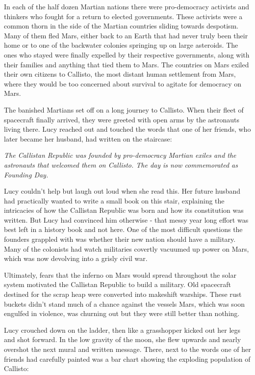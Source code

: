 \documentclass[openany, 12pt]{book} %
\begin{document}
In each of the half dozen Martian nations there were pro-democracy activists and thinkers who fought for a return to elected governments. These activists were a common thorn in the side of the Martian countries sliding towards despotism. Many of them fled Mars, either back to an Earth that had never truly been their home or to one of the backwater colonies springing up on large asteroids. The ones who stayed were finally expelled by their respective governments, along with their families and anything that tied them to Mars. The countries on Mars exiled their own citizens to Callisto, the most distant human settlement from Mars, where they would be too concerned about survival to agitate for democracy on Mars.

The banished Martians set off on a long journey to Callisto. When their fleet of spacecraft finally arrived, they were greeted with open arms by the astronauts living there. Lucy reached out and touched the words that one of her friends, who later became her husband, had written on the staircase:

\textit{The Callistan Republic was founded by pro-democracy Martian exiles and the astronauts that welcomed them on Callisto. The day is now commemorated as Founding Day.}

Lucy couldn't help but laugh out loud when she read this. Her future husband had practically wanted to write a small book on this stair, explaining the intricacies of how the Callistan Republic was born and how its constitution was written. But Lucy had convinced him otherwise - that messy year long effort was best left in a history book and not here. One of the most difficult questions the founders grappled with was whether their new nation should have a military. Many of the colonists had watch militaries covertly vacuumed up power on Mars, which was now devolving into a grisly civil war.

Ultimately, fears that the inferno on Mars would spread throughout the solar system motivated the Callistan Republic to build a military. Old spacecraft destined for the scrap heap were converted into makeshift warships. These rust buckets didn't stand much of a chance against the vessels Mars, which was soon engulfed in violence, was churning out but they were still better than nothing.

Lucy crouched down on the ladder, then like a grasshopper kicked out her legs and shot forward. In the low gravity of the moon, she flew upwards and nearly overshot the next mural and written message. There, next to the words one of her friends had carefully painted was a bar chart showing the exploding population of Callisto: 
\end{document}
